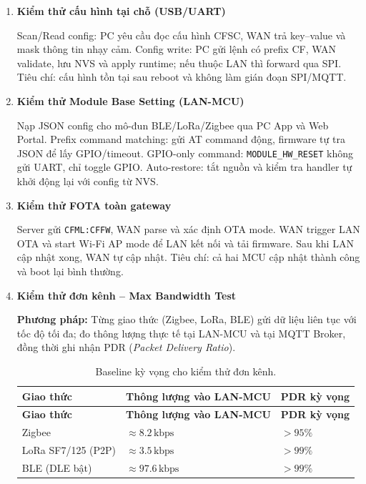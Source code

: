 \begin{enumerate}
            \item \textbf{Kiểm thử cấu hình tại chỗ (USB/UART)}
        
            Scan/Read config: PC yêu cầu đọc cấu hình CFSC, WAN trả key--value và mask thông tin nhạy cảm. Config write: PC gửi lệnh có prefix CF, WAN validate, lưu NVS và apply runtime; nếu thuộc LAN thì forward qua SPI. Tiêu chí: cấu hình tồn tại sau reboot và không làm gián đoạn SPI/MQTT.
        
            \item \textbf{Kiểm thử Module Base Setting (LAN-MCU)}
        
            Nạp JSON config cho mô-đun BLE/LoRa/Zigbee qua PC App và Web Portal. Prefix command matching: gửi AT command động, firmware tự tra JSON để lấy GPIO/timeout. GPIO-only command: \texttt{MODULE\_HW\_RESET} không gửi UART, chỉ toggle GPIO. Auto-restore: tắt nguồn và kiểm tra handler tự khởi động lại với config từ NVS.
        
            \item \textbf{Kiểm thử FOTA toàn gateway}
        
            Server gửi \texttt{CFML:CFFW}, WAN parse và xác định OTA mode. WAN trigger LAN OTA và start Wi-Fi AP mode để LAN kết nối và tải firmware. Sau khi LAN cập nhật xong, WAN tự cập nhật. Tiêu chí: cả hai MCU cập nhật thành công và boot lại bình thường.

            \item \textbf{Kiểm thử đơn kênh -- Max Bandwidth Test}

            \textbf{Phương pháp:} Từng giao thức (Zigbee, LoRa, BLE) gửi dữ liệu liên tục với tốc độ tối đa; đo thông lượng thực tế tại LAN-MCU và tại MQTT Broker, đồng thời ghi nhận PDR (\textit{Packet Delivery Ratio}).
            
            \begin{longtable}{|p{4.5cm}|p{4.5cm}|p{3.5cm}|}
                \caption{Baseline kỳ vọng cho kiểm thử đơn kênh.}
                \label{tab:single_channel_baseline} \\
                \hline
                \textbf{Giao thức} & \textbf{Thông lượng vào LAN-MCU} & \textbf{PDR kỳ vọng} \\ \hline
                \endfirsthead
                \hline
                \textbf{Giao thức} & \textbf{Thông lượng vào LAN-MCU} & \textbf{PDR kỳ vọng} \\ \hline
                \endhead
                \hline
                \endfoot
                \endlastfoot
                Zigbee & $\approx 8{.}2\,\text{kbps}$ & $> 95\%$ \\ \hline
                LoRa SF7/125 (P2P) & $\approx 3{.}5\,\text{kbps}$ & $> 99\%$ \\ \hline
                BLE (DLE bật) & $\approx 97{.}6\,\text{kbps}$ & $> 99\%$ \\ \hline
            \end{longtable}
            

\end{enumerate}
